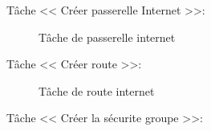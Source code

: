 {\begin{tikzpicture}
            \end{tikzpicture} Tâche << Créer passerelle Internet >>:
            \begin{figure}[H]
              \begin{center}
              \end{center}
              \caption{Tâche de passerelle internet}
              \end{figure}
              \indent
               Tâche << Créer route >>:
               \begin{figure}[H]
                 \begin{center}
                 \end{center}
                 \caption{Tâche de route internet}
                \end{figure}
                \indent
                 Tâche << Créer la sécurite groupe >>:
                 \begin{figure}[H]
                   \begin{center}

\end{center}
\end{figure}}
